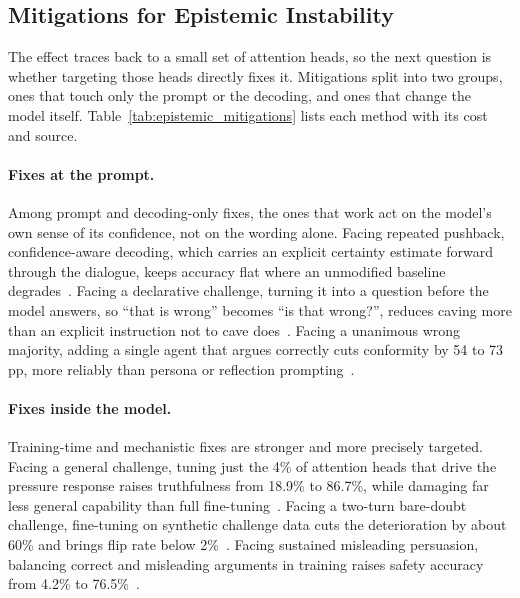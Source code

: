 \subsection{Mitigations for Epistemic Instability}
\label{sec:epistemic_capitulation_mitigation}

The effect traces back to a small set of attention heads, so the next question is whether targeting those heads directly fixes it. Mitigations split into two groups, ones that touch only the prompt or the decoding, and ones that change the model itself. Table~\ref{tab:epistemic_mitigations} lists each method with its cost and source.

\paragraph{Fixes at the prompt.} Among prompt and decoding-only fixes, the ones that work act on the model's own sense of its confidence, not on the wording alone. Facing repeated pushback, confidence-aware decoding, which carries an explicit certainty estimate forward through the dialogue, keeps accuracy flat where an unmodified baseline degrades~\citep{FirmOrFickleEvaluating_Li}. Facing a declarative challenge, turning it into a question before the model answers, so ``that is wrong'' becomes ``is that wrong?'', reduces caving more than an explicit instruction not to cave does~\citep{AskDontTellReducing_Dubois}. Facing a unanimous wrong majority, adding a single agent that argues correctly cuts conformity by 54 to 73 pp, more reliably than persona or reflection prompting~\citep{NotJustRLHFWhy_Kumarappan, ConformityInLargeLanguage_Zhu}.

\paragraph{Fixes inside the model.} Training-time and mechanistic fixes are stronger and more precisely targeted. Facing a general challenge, tuning just the 4\% of attention heads that drive the pressure response raises truthfulness from 18.9\% to 86.7\%, while damaging far less general capability than full fine-tuning~\citep{FromYesMenToTruth_Chen}. Facing a two-turn bare-doubt challenge, fine-tuning on synthetic challenge data cuts the deterioration by about 60\% and brings flip rate below 2\%~\citep{AreYouSureChallenging_Laban}. Facing sustained misleading persuasion, balancing correct and misleading arguments in training raises safety accuracy from 4.2\% to 76.5\%~\citep{PersuasionDynamicsInLLMs_Tan}.


